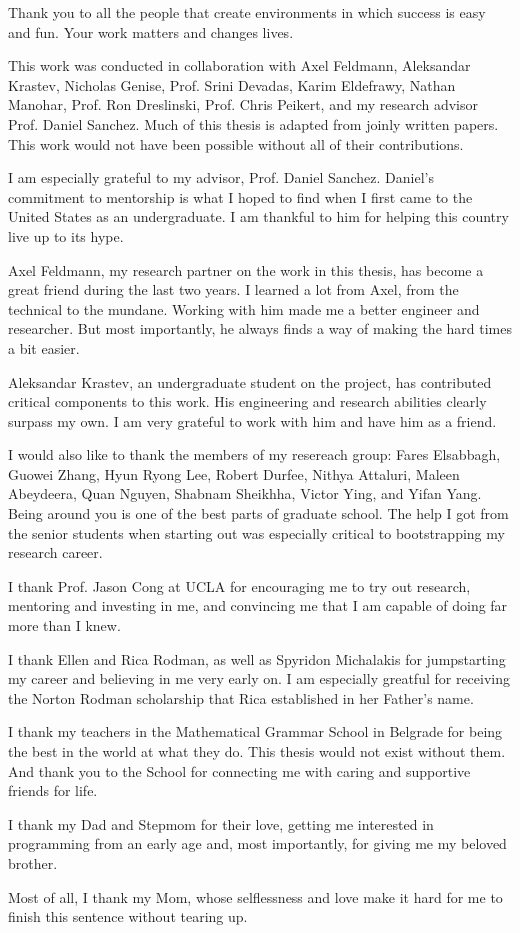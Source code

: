 Thank you to all the people that create environments in which success is easy
and fun. Your work matters and changes lives.

This work was conducted in collaboration with Axel Feldmann, Aleksandar
Krastev, Nicholas Genise, Prof. Srini Devadas, Karim Eldefrawy, Nathan Manohar,
Prof. Ron Dreslinski, Prof. Chris Peikert, and my research advisor Prof. Daniel
Sanchez. Much of this thesis is adapted from joinly written papers. This work
would not have been possible without all of their contributions.

I am especially grateful to my advisor, Prof. Daniel Sanchez. Daniel's
commitment to mentorship is what I hoped to find when I first came to the
United States as an undergraduate. I am thankful to him for helping this
country live up to its hype.

Axel Feldmann, my research partner on the work in this thesis, has become a
great friend during the last two years. I learned a lot from Axel, from the
technical to the mundane. Working with him made me a better engineer and
researcher. But most importantly, he always finds a way of making the hard
times a bit easier.

Aleksandar Krastev, an undergraduate student on the project, has contributed
critical components to this work. His engineering and research abilities
clearly surpass my own. I am very grateful to work with him and have him as a
friend.

I would also like to thank the members of my resereach group: Fares Elsabbagh,
Guowei Zhang, Hyun Ryong Lee, Robert Durfee, Nithya Attaluri, Maleen Abeydeera,
Quan Nguyen, Shabnam Sheikhha, Victor Ying, and Yifan Yang. Being around you is
one of the best parts of graduate school. The help I got from the senior
students when starting out was especially critical to bootstrapping my
research career.

I thank Prof. Jason Cong at UCLA for encouraging me to try out research,
mentoring and investing in me, and convincing me that I am capable of doing far
more than I knew.

I thank Ellen and Rica Rodman, as well as Spyridon Michalakis for jumpstarting
my career and believing in me very early on. I am especially greatful for
receiving the Norton Rodman scholarship that Rica established in her Father's
name.

I thank my teachers in the Mathematical Grammar School in Belgrade for being
the best in the world at what they do. This thesis would not exist without
them. And thank you to the School for connecting me with caring and supportive
friends for life.

I thank my Dad and Stepmom for their love, getting me interested in programming
from an early age and, most importantly, for giving me my beloved brother.

Most of all, I thank my Mom, whose selflessness and love make it hard for me to
finish this sentence without tearing up.
